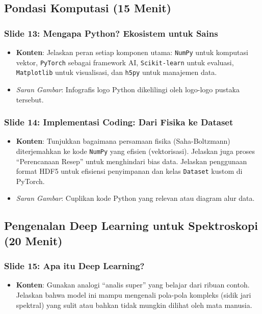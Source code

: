 \documentclass[12pt, a4paper]{article}
\begin{document}
\subsection{Pondasi Komputasi (15 Menit)}

\subsubsection*{Slide 13: Mengapa Python? Ekosistem untuk Sains}
\begin{itemize}
    \item \textbf{Konten}: Jelaskan peran setiap komponen utama: \texttt{NumPy} untuk komputasi vektor, \texttt{PyTorch} sebagai framework AI, \texttt{Scikit-learn} untuk evaluasi, \texttt{Matplotlib} untuk visualisasi, dan \texttt{h5py} untuk manajemen data.
    \item \textit{Saran Gambar}: Infografis logo Python dikelilingi oleh logo-logo pustaka tersebut.
\end{itemize}

\subsubsection*{Slide 14: Implementasi Coding: Dari Fisika ke Dataset}
\begin{itemize}
    \item \textbf{Konten}: Tunjukkan bagaimana persamaan fisika (Saha-Boltzmann) diterjemahkan ke kode \texttt{NumPy} yang efisien (vektorisasi). Jelaskan juga proses ``Perencanaan Resep'' untuk menghindari bias data. Jelaskan penggunaan format HDF5 untuk efisiensi penyimpanan dan kelas \texttt{Dataset} kustom di PyTorch.
    \item \textit{Saran Gambar}: Cuplikan kode Python yang relevan atau diagram alur data.
\end{itemize}


\subsection{Pengenalan Deep Learning untuk Spektroskopi (20 Menit)}

\subsubsection*{Slide 15: Apa itu Deep Learning?}
\begin{itemize}
    \item \textbf{Konten}: Gunakan analogi ``analis super'' yang belajar dari ribuan contoh. Jelaskan bahwa model ini mampu mengenali pola-pola kompleks (sidik jari spektral) yang sulit atau bahkan tidak mungkin dilihat oleh mata manusia.
\end{itemize}
\end{document}
